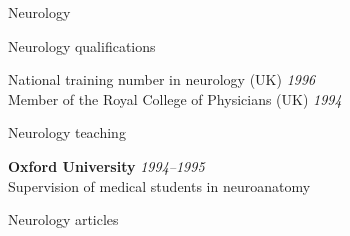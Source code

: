 \documentclass{cv}
\newcommand{\PlaceDateNote}[3]{{\bf #1} \hfill {\em #2} \\#3}
\begin{document}
\begin{cvSection}{Neurology}

\begin{cvSubSection}{Neurology qualifications}

National training number in neurology (UK) \hfill {\em 1996} \\
Member of the Royal College of Physicians (UK) \hfill {\em 1994}

\end{cvSubSection}

\begin{cvSubSection}{Neurology teaching}

\PlaceDateNote{Oxford University}{1994--1995}{
Supervision of medical students in neuroanatomy}

\end{cvSubSection}

\begin{cvSubSection}{Neurology articles}

\printbibliography[heading=none,
    keyword=neurology,
notkeyword=omit]

\end{cvSubSection}

\end{cvSection}
\end{document}
